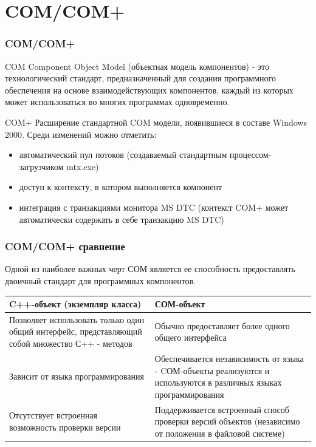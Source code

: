 \documentclass{beamer}
\begin{document}
\section{COM/COM+}

\begin{frame}
\frametitle{COM/COM+}

\begin{block}{COM}
Component Object Model (объектная модель компонентов) - это технологический стандарт, предназначенный для создания программного обеспечения на основе взаимодействующих компонентов, каждый из которых может использоваться во многих программах одновременно.
\end{block}

\begin{block}{COM+}
Расширение стандартной COM модели, появившиеся в составе Windows 2000. Среди изменений можно отметить:
\begin{itemize}
\item автоматический пул потоков (создаваемый стандартным процессом-загрузчиком mtx.exe)
\item доступ к контексту, в котором выполняется компонент
\item интеграция с транзакциями монитора MS DTC (контекст COM+ может автоматически содержать в себе транзакцию MS DTC)
\end{itemize}
\end{block}

\end{frame}


\begin{frame}
\frametitle{COM/COM+ сравнение}

Одной из наиболее важных черт СОМ является ее способность предоставлять двоичный стандарт для программных компонентов.
\medskip

\begin{tabular}{|p{5.5cm}|p{5.5cm}|}
\hline 
C++-объект (экземпляр класса) & СОМ-объект \\ 
\hline 
Позволяет использовать только один общий интерфейс, представляющий собой множество С++ - методов & Обычно предоставляет более одного общего интерфейса \\ 
\hline 
Зависит от языка программирования & Обеспечивается независимость от языка - CОМ-объекты реализуются и используются в различных языках программирования \\ 
\hline 
Отсутствует встроенная возможность проверки версии & Поддерживается встроенный способ проверки версий объектов (независимо от положения в файловой системе) \\ 
\hline 
\end{tabular} 

\end{frame}
\end{document}
